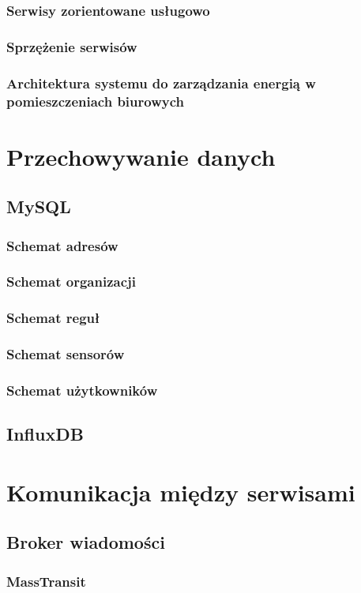 \documentclass[11pt]{article} %
\begin{document}
\subsubsection{Serwisy zorientowane usługowo}
\subsubsection{Sprzężenie serwisów}
\subsubsection{Architektura systemu do zarządzania energią w pomieszczeniach biurowych}
\section{Przechowywanie danych}
\subsection{MySQL}
\subsubsection{Schemat adresów}
\subsubsection{Schemat organizacji}
\subsubsection{Schemat reguł}
\subsubsection{Schemat sensorów}
\subsubsection{Schemat użytkowników}
\subsection{InfluxDB}
\section{Komunikacja między serwisami}
\subsection{Broker wiadomości}
\subsubsection{MassTransit}
\end{document}
